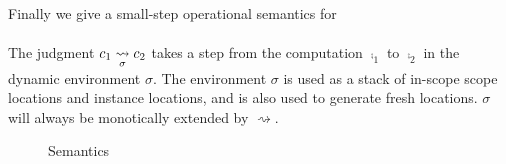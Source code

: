 {Finally we give a small-step operational semantics for \lang{}
\\\\
The judgment $c_1 \underset{\sigma}{\rightsquigarrow} c_2$ takes a step from the computation $\comp_1$ to $\comp_2$ in the dynamic environment $\sigma$.
The environment $\sigma$ is used as a stack of in-scope scope locations and instance locations, and is also used to generate fresh locations.
$\sigma$ will always be monotically extended by $\rightsquigarrow$.

\begin{figure}[h]
\caption{Semantics}
\centering
{}
\end{figure}

}
